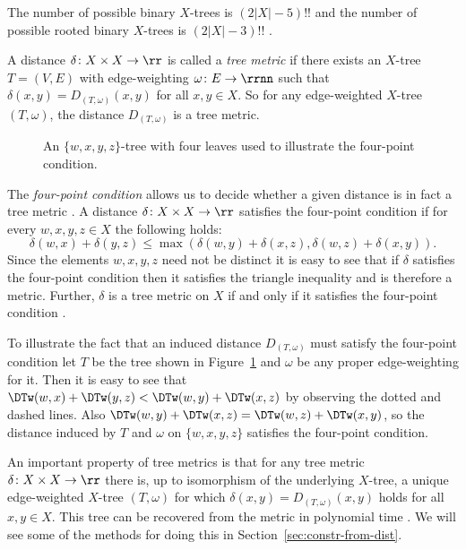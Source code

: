 The number of possible binary $X$-trees is $(2|X|-5)!!$ and the number of
possible rooted binary $X$-trees is $(2|X|-3)!!$
\cite{felsenstein2004inferring}.


A distance $\delta \colon X \times X \to \rr$ is called a \textit{tree metric}
if there exists an $X$-tree $T=(V,E)$ with edge-weighting $\omega \colon E \to
\rrnn$ such that $\delta(x,y) = D_{(T,\omega)}(x,y)$ for all $x,y \in X$.  So
for any edge-weighted $X$-tree $(T,\omega)$, the distance $D_{(T,\omega)}$ is
a tree metric.

\begin{figure}
  \centering
  
  \caption{An $\{w,x,y,z\}$-tree with four leaves used to illustrate the
    four-point condition.}
  \label{fig:quartet-tree}
\end{figure}

The \textit{four-point condition} allows us to decide whether a given distance
is in fact a tree metric \cite{semple2003phylogenetics}.  A distance $\delta
\colon X \times X \to \rr$ satisfies the four-point condition if for every
$w,x,y,z \in X$ the following holds:
\begin{equation*}
  \delta(w,x) + \delta(y,z) \leq \max(\delta(w,y)+\delta(x,z),
                                      \delta(w,z)+\delta(x,y)).
\end{equation*}
Since the elements $w,x,y,z$ need not be distinct it is easy to see that if
$\delta$ satisfies the four-point condition then it satisfies the triangle
inequality and is therefore a metric.  Further, $\delta$ is a tree metric on
$X$ if and only if it satisfies the four-point condition
\cite[Theorem 7.2.6]{semple2003phylogenetics}.

To illustrate the fact that an induced distance $D_{(T,\omega)}$ must satisfy
the four-point condition let $T$ be the tree shown in
Figure~\ref{fig:quartet-tree} and $\omega$ be any proper edge-weighting for
it.  Then it is easy to see that $\DTw(w,x)+\DTw(y,z) < \DTw(w,y)+\DTw(x,z)$
by observing the dotted and dashed lines.  Also $\DTw(w,y)+\DTw(x,z) =
\DTw(w,z)+\DTw(x,y)$, so the distance induced by $T$ and $\omega$ on
$\{w,x,y,z\}$ satisfies the four-point condition.

An important property of tree metrics is that for any tree metric $\delta
\colon X \times X \to \rr$ there is, up to isomorphism of the underlying
$X$-tree, a unique edge-weighted $X$-tree $(T,\omega)$ for which $\delta(x,y)
= D_{(T,\omega)}(x,y)$ holds for all $x,y \in X$.  This tree can be recovered
from the metric in polynomial time \cite{semple2003phylogenetics}.  We will
see some of the methods for doing this in Section~\ref{sec:constr-from-dist}.

